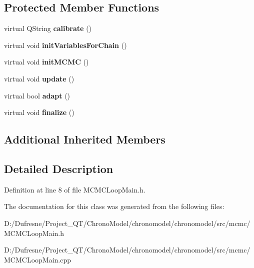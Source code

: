 \subsection*{Protected Member Functions}
\begin{DoxyCompactItemize}
\item 
\hypertarget{class_m_c_m_c_loop_main_ab00783f7cb1798e43319352be89c7353}{virtual Q\-String {\bfseries calibrate} ()}\label{class_m_c_m_c_loop_main_ab00783f7cb1798e43319352be89c7353}

\item 
\hypertarget{class_m_c_m_c_loop_main_a6d56a261f1c2ac8f81e09e5add595612}{virtual void {\bfseries init\-Variables\-For\-Chain} ()}\label{class_m_c_m_c_loop_main_a6d56a261f1c2ac8f81e09e5add595612}

\item 
\hypertarget{class_m_c_m_c_loop_main_af26f7a9c678456e7e268cf3670b2b46c}{virtual void {\bfseries init\-M\-C\-M\-C} ()}\label{class_m_c_m_c_loop_main_af26f7a9c678456e7e268cf3670b2b46c}

\item 
\hypertarget{class_m_c_m_c_loop_main_a43b23b5b47acf0f31f7c7bc1e115d261}{virtual void {\bfseries update} ()}\label{class_m_c_m_c_loop_main_a43b23b5b47acf0f31f7c7bc1e115d261}

\item 
\hypertarget{class_m_c_m_c_loop_main_a6e3dafd705359edffe1b5ae1c9f13bd6}{virtual bool {\bfseries adapt} ()}\label{class_m_c_m_c_loop_main_a6e3dafd705359edffe1b5ae1c9f13bd6}

\item 
\hypertarget{class_m_c_m_c_loop_main_acb50313f01964e19d48deaac9defc776}{virtual void {\bfseries finalize} ()}\label{class_m_c_m_c_loop_main_acb50313f01964e19d48deaac9defc776}

\end{DoxyCompactItemize}
\subsection*{Additional Inherited Members}


\subsection{Detailed Description}


Definition at line 8 of file M\-C\-M\-C\-Loop\-Main.\-h.



The documentation for this class was generated from the following files\-:\begin{DoxyCompactItemize}
\item 
D\-:/\-Dufresne/\-Project\-\_\-\-Q\-T/\-Chrono\-Model/chronomodel/chronomodel/src/mcmc/M\-C\-M\-C\-Loop\-Main.\-h\item 
D\-:/\-Dufresne/\-Project\-\_\-\-Q\-T/\-Chrono\-Model/chronomodel/chronomodel/src/mcmc/M\-C\-M\-C\-Loop\-Main.\-cpp\end{DoxyCompactItemize}
